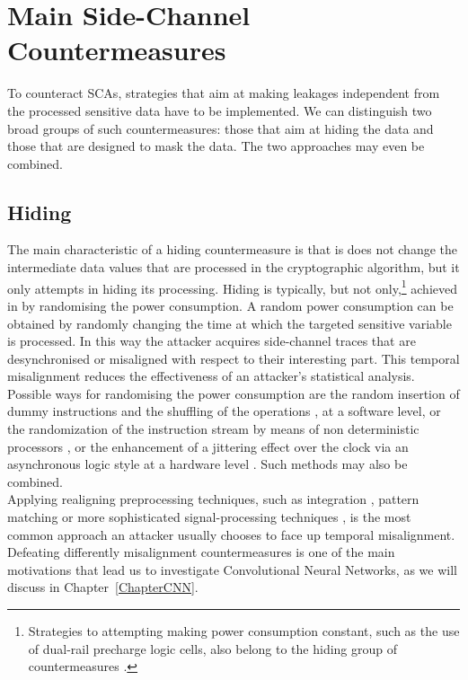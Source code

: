 \section{Main Side-Channel Countermeasures}\label{sec:countermeasures}
To counteract SCAs, strategies that aim at making leakages independent from the processed sensitive data have to be implemented. We can distinguish two broad groups of such countermeasures: 
those that aim at hiding the data and those that are designed to mask the data. The two approaches may even be combined.

\subsection{Hiding}
The main characteristic of a hiding countermeasure is that is does not change the intermediate data values that are processed in the cryptographic algorithm, but it only attempts in hiding its processing. Hiding is typically, but not only,\footnote{Strategies to attempting making power consumption constant, such as the use of dual-rail precharge logic cells, also belong to the hiding group of countermeasures \cite{popp2005masked}.} achieved in by randomising the power consumption. A random power consumption can be obtained by randomly changing the time at which the targeted sensitive variable is processed. In this way the attacker acquires side-channel traces that are desynchronised or misaligned with respect to their interesting part. This temporal misalignment reduces the effectiveness of an attacker's statistical analysis. Possible ways for randomising the power consumption are the random insertion of dummy instructions \cite{coron2009efficient,coron2010analysis} and the shuffling of the operations \cite{veyrat2012shuffling}, at a software level, or the randomization of the instruction stream by means of non deterministic processors \cite{irwin2002instruction,may2001non}, or the enhancement of a jittering effect over the clock via an asynchronous logic style at a hardware level \cite{moore2002improving,moore2003balanced}. Such methods may also be combined. \\

Applying realigning preprocessing techniques, such as integration \cite{mangard2004hardware,mangard2008power}, pattern matching \cite{nagashima2007dpa} or more sophisticated signal-processing techniques \cite{van2011improving}, is the most common approach an attacker usually chooses to face up temporal misalignment. Defeating differently misalignment countermeasures is one of the main motivations that lead us to investigate Convolutional Neural Networks, as we will discuss in Chapter~\ref{ChapterCNN}.

